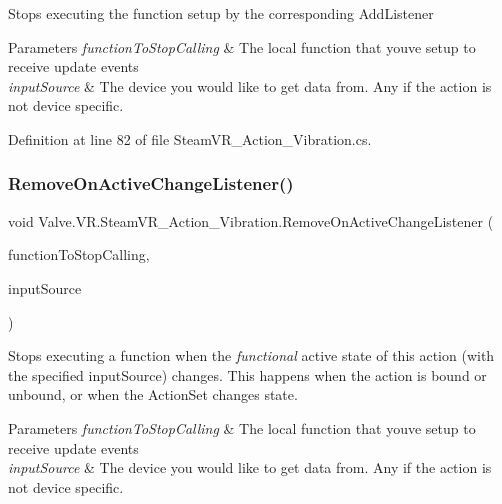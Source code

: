 Stops executing the function setup by the corresponding Add\+Listener 


\begin{DoxyParams}{Parameters}
{\em function\+To\+Stop\+Calling} & The local function that you\textquotesingle{}ve setup to receive update events\\
\hline
{\em input\+Source} & The device you would like to get data from. Any if the action is not device specific.\\
\hline
\end{DoxyParams}


Definition at line 82 of file Steam\+V\+R\+\_\+\+Action\+\_\+\+Vibration.\+cs.

\mbox{\label{class_valve_1_1_v_r_1_1_steam_v_r___action___vibration_a60f0e8aeed560759d517a576ff56bfa7}} 
\subsubsection{\texorpdfstring{RemoveOnActiveChangeListener()}{RemoveOnActiveChangeListener()}}
{\footnotesize\ttfamily void Valve.\+V\+R.\+Steam\+V\+R\+\_\+\+Action\+\_\+\+Vibration.\+Remove\+On\+Active\+Change\+Listener (\begin{DoxyParamCaption}\item[{\mbox{\hyperlink{class_valve_1_1_v_r_1_1_steam_v_r___action___vibration_a7706b3c9b71de3bea16a3fab8a882f0b}{Active\+Change\+Handler}}}]{function\+To\+Stop\+Calling,  }\item[{\mbox{\hyperlink{namespace_valve_1_1_v_r_a82e5bf501cc3aa155444ee3f0662853f}{Steam\+V\+R\+\_\+\+Input\+\_\+\+Sources}}}]{input\+Source }\end{DoxyParamCaption})}



Stops executing a function when the {\itshape functional} active state of this action (with the specified input\+Source) changes. This happens when the action is bound or unbound, or when the Action\+Set changes state. 


\begin{DoxyParams}{Parameters}
{\em function\+To\+Stop\+Calling} & The local function that you\textquotesingle{}ve setup to receive update events\\
\hline
{\em input\+Source} & The device you would like to get data from. Any if the action is not device specific.\\
\hline
\end{DoxyParams}


